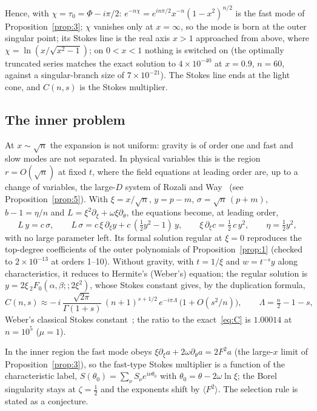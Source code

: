 \documentclass[aps,prd,onecolumn,superscriptaddress,nofootinbib,10pt]{revtex4-2}
\begin{document}
Hence, with $\chi = \tau_0 = \Phi - i\pi/2$: $e^{-n\chi} = e^{in\pi/2}x^{-n}(1-x^2)^{n/2}$ is the fast mode of Proposition~\ref{prop:3}; $\chi$ vanishes only
at $x = \infty$, so the mode is born at the outer singular point; its Stokes line is the real axis $x > 1$ approached
from above, where $\chi = \ln(x/\sqrt{x^2-1})$; on $0 < x < 1$ nothing is switched on (the optimally truncated series
matches the exact solution to $4\times10^{-40}$ at $x = 0.9$, $n = 60$, against a singular-branch size of
$7\times10^{-21}$). The Stokes line ends at the light cone, and $C(n,s)$ is the Stokes multiplier.

\subsection{The inner problem}
\label{sec:inner}

At $x \sim \sqrt n$ the expansion is not uniform: gravity is of order one and fast and slow modes are not separated.
In physical variables this is the region $r = O(\sqrt n)$ at fixed $t$, where the field equations at leading order are, up
to a change of variables, the large-$D$ system of Rozali and Way~\cite{RozaliWay2018} (see Proposition~\ref{prop:5}). With $\xi = x/\sqrt n$, $y = p - m$, $\sigma = \sqrt n\,(p+m)$, $b - 1 = \eta/n$ and
$L = \xi^2\partial_\xi + \omega\xi\partial_\theta$, the equations become, at leading order,
\begin{equation}
L\,y = c\,\sigma, \qquad L\,\sigma = c\,\xi\,\partial_\xi y + c\,(\tfrac12y^2 - 1)\,y, \qquad
\xi\,\partial_\xi c = \tfrac12\,c\,y^2, \qquad \eta = \tfrac12y^2,
\end{equation}
with no large parameter left. Its formal solution regular at $\xi = 0$ reproduces the top-degree coefficients of the
outer polynomials of Proposition~\ref{prop:1} (checked to $2\times10^{-13}$ at orders 1--10). Without gravity, with
$t = 1/\xi$ and $w = t^{-s}y$ along characteristics, it reduces to Hermite's (Weber's) equation; the regular solution is
$y = 2\xi\,{}_2F_0(\alpha,\beta;;2\xi^2)$, whose Stokes constant gives, by the duplication formula,
\begin{equation}
C(n,s) \approx -\,i\,\frac{\sqrt{2\pi}}{\Gamma(1+s)}\,(n+1)^{s+1/2}\,e^{-i\pi\Lambda}\,\big(1 + O(s^2/n)\big), \qquad \Lambda = \tfrac n2 - 1 - s,
\end{equation}
Weber's classical Stokes constant~\cite{DLMF}; the ratio to the exact~\eqref{eq:C} is $1.00014$ at $n = 10^5$ ($\mu = 1$).

In the inner region the fast mode obeys $\xi\partial_\xi a + 2\omega\partial_\theta a = 2F^2a$ (the large-$x$ limit of
Proposition~\ref{prop:3}), so the fast-type Stokes multiplier is a function of the characteristic label,
$S(\theta_0) = \sum_\nu S_\nu e^{i\nu\theta_0}$ with $\theta_0 = \theta - 2\omega\ln\xi$; the Borel singularity stays at
$\zeta = \tfrac12$ and the exponents shift by $\langle F^2\rangle$. The selection rule is stated as a conjecture.
\end{document}

